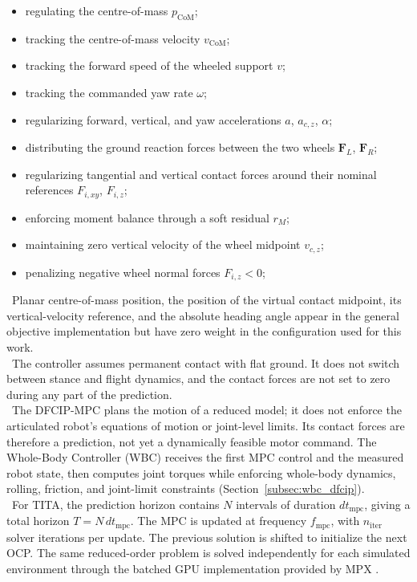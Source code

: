 \begin{itemize}
    \item regulating the centre-of-mass $p_{\mathrm{CoM}}$;
    \item tracking the centre-of-mass velocity $v_{\mathrm{CoM}}$;
    \item tracking the forward speed of the wheeled support $v$;
    \item tracking the commanded yaw rate $\omega$;
    \item regularizing forward, vertical, and yaw accelerations $a$, $a_{c,z}$, $\alpha$;
    \item distributing the ground reaction forces between the two wheels $\mathbf{F}_L$, $\mathbf{F}_R$;
    \item regularizing tangential and vertical contact forces around their nominal references $F_{i,xy}$, $F_{i,z}$;
    \item enforcing moment balance through a soft residual $r_M$;
    \item maintaining zero vertical velocity of the wheel midpoint $v_{c,z}$;
    \item penalizing negative wheel normal forces $F_{i,z}<0$;
\end{itemize}
\
Planar centre-of-mass position, the position of the virtual contact midpoint,
its vertical-velocity reference, and the absolute heading angle appear in the
general objective implementation but have zero weight in the configuration
used for this work.\\
\
The controller assumes permanent contact with flat ground. It does not
switch between stance and flight dynamics, and the contact forces are not set
to zero during any part of the prediction.\\
\
The DFCIP-MPC plans the motion of a reduced model; it does not enforce the
articulated robot's equations of motion or joint-level limits. Its contact
forces are therefore a prediction, not yet a dynamically feasible motor
command. The Whole-Body Controller (WBC) receives the first MPC control and
the measured robot state, then computes joint torques while enforcing
whole-body dynamics, rolling, friction, and joint-limit constraints
(Section~\ref{subsec:wbc_dfcip}).\\
\
For TITA, the prediction horizon contains $N$ intervals of duration
$dt_{\mathrm{mpc}}$, giving a total horizon $T = N\,dt_{\mathrm{mpc}}$.
The MPC is updated at frequency $f_{\mathrm{mpc}}$, with
$n_{\mathrm{iter}}$ solver iterations per update. The previous solution is
shifted to initialize the next OCP. The same reduced-order problem is solved
independently for each simulated environment through the batched GPU
implementation provided by MPX \cite{mpx}.


